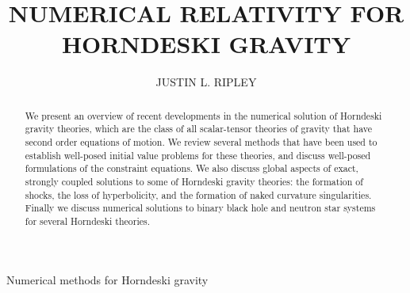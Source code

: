 \documentclass{ws-ijmpd}
\begin{document}
{Numerical methods for Horndeski gravity}

%
\catchline{}{}{}{}{}
%

\title{NUMERICAL RELATIVITY FOR HORNDESKI GRAVITY}

\author{JUSTIN L. RIPLEY}

\address{Department of Applied Mathematics and Theoretical Physics, \\
University of Cambridge, Cambridge, CB3 0WA,
United Kingdom
\\
\;
\\
Illinois Center for Advanced Studies of the Universe \& Department of Physics,
University of Illinois at Urbana-Champaign, Urbana, Illinois 61801, USA
\\
\;
\\
jr860@cam.ac.uk}

\maketitle

\begin{history}
\end{history}

\begin{abstract}
   We present an overview of recent developments in the numerical solution
   of Horndeski gravity theories, which are the class of all scalar-tensor
   theories of gravity that have second order equations of motion.
   We review several methods that have been used to establish
   well-posed initial value problems for these theories,
   and discuss well-posed formulations of the constraint equations.
   We also discuss global aspects of exact, strongly coupled solutions to 
   some of Horndeski gravity theories: 
   the formation of shocks, the loss of hyperbolicity, 
   and the formation of naked curvature singularities.
   Finally we discuss numerical solutions to binary black hole and
   neutron star systems for several Horndeski theories.
\end{abstract}



\tableofcontents

\end{document}
